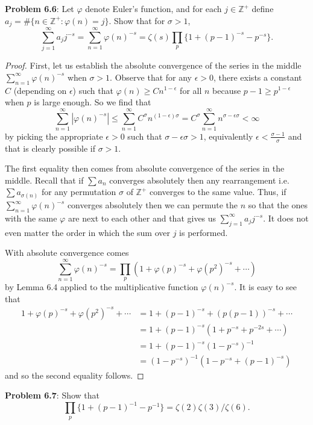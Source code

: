 \documentclass[12pt]{article}
\newcommand{\Z}{\mathbb{Z}}
\begin{document}
\fi

\textbf{Problem 6.6}: Let $\varphi$ denote Euler's function, and for each $j \in \Z^+$ define $a_j = \#\{n \in \Z^+ : \varphi(n) = j\}$. Show that for $\sigma > 1$,
$$\sum_{j = 1}^{\infty} a_j j^{-s} = \sum_{n = 1}^{\infty} \varphi(n)^{-s} = \zeta(s) \prod_p \{ 1 + (p - 1)^{-s} - p^{-s} \}.$$

\begin{proof}
First, let us establish the absolute convergence of the series in the middle $\sum_{n = 1}^{\infty} \varphi(n)^{-s}$ when $\sigma > 1$. Observe that for any $\epsilon > 0$, there exists a constant $C$ (depending on $\epsilon$) such that $\varphi(n) \geq C n^{1 - \epsilon}$ for all $n$ because $p - 1 \geq p^{1-\epsilon}$ when $p$ is large enough. So we find that
$$\sum_{n = 1}^{\infty} |\varphi(n)^{-s}| \leq \sum_{n = 1}^{\infty} C^\sigma n^{(1 - \epsilon) \sigma} = C^\sigma \sum_{n = 1}^{\infty} n^{\sigma - \epsilon \sigma} < \infty$$
by picking the appropriate $\epsilon > 0$ such that $\sigma - \epsilon \sigma > 1$, equivalently $\epsilon < \frac{\sigma - 1}{\sigma}$ and that is clearly possible if $\sigma > 1$.

The first equality then comes from absolute convergence of the series in the middle. Recall that if $\sum a_n$ converges absolutely then any rearrangement i.e. $\sum a_{\sigma(n)}$ for any permutation $\sigma$ of $\Z^+$ converges to the same value. Thus, if $\sum_{n = 1}^{\infty} \varphi(n)^{-s}$ converges absolutely then we can permute the $n$ so that the ones with the same $\varphi$ are next to each other and that gives us $\sum_{j = 1}^{\infty} a_j j^{-s}$. It does not even matter the order in which the sum over $j$ is performed.

With absolute convergence comes
$$\sum_{n = 1}^{\infty} \varphi(n)^{-s} = \prod_p (1 + \varphi(p)^{-s} + \varphi(p^2)^{-s} + \cdots)$$
by Lemma 6.4 applied to the multiplicative function $\varphi(n)^{-s}$. It is easy to see that
\begin{align*}
1 + \varphi(p)^{-s} + \varphi(p^2)^{-s} + \cdots &= 1 + (p - 1)^{-s} + (p(p-1))^{-s} + \cdots\\
&= 1 + (p-1)^{-s} (1 + p^{-s} + p^{-2s} + \cdots)\\
&= 1 + (p-1)^{-s} (1 - p^{-s})^{-1}\\
&= (1 - p^{-s})^{-1} (1 - p^{-s} + (p-1)^{-s})
\end{align*}
and so the second equality follows.
\end{proof}

\textbf{Problem 6.7}: Show that
$$\prod_p \{ 1 + (p - 1)^{-1} - p^{-1} \} = \zeta(2) \zeta(3) / \zeta(6).$$
\end{document}
